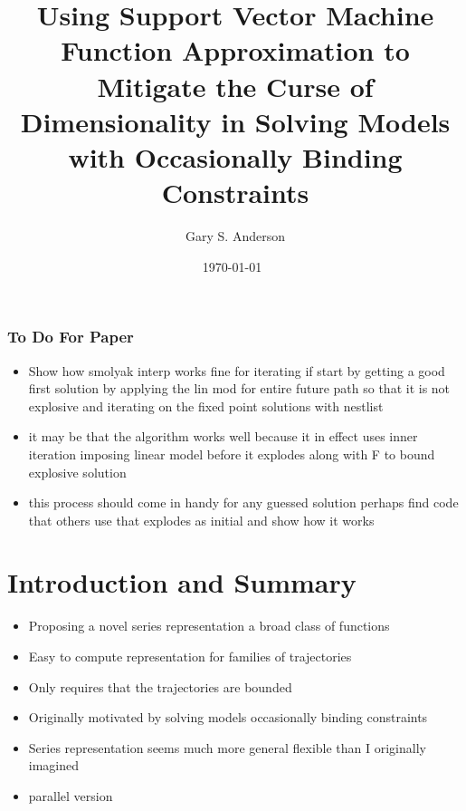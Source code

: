 \documentclass[tikz]{beamer}
\begin{document}
\title[SVM Regression for DR Series Approximation]{Using Support Vector Machine Function Approximation to
Mitigate the Curse of Dimensionality in Solving Models with Occasionally Binding Constraints}

\author{Gary S. Anderson}
\date{\today\ } 


\frame{\titlepage}

\begin{frame}
  \frametitle{To Do For Paper}

  \begin{itemize}
  \item Show how smolyak interp works fine for iterating if start by getting
    a good first solution by applying the lin mod for entire future path so that it is not explosive and iterating on the fixed point solutions  with nestlist
    
  \item it may be that the algorithm works well because it in effect uses inner  iteration imposing linear model before it explodes along with F to bound explosive solution 
  \item this process should come in handy for any guessed solution perhaps
    find code that others use that explodes as initial and show how it works
  \end{itemize}
\end{frame}
\section{Introduction and Summary}

\begin{frame}

 \begin{itemize}
 \item Proposing a novel series representation a broad class of functions
 \item Easy to compute representation for families of trajectories
\item Only requires that the trajectories are bounded
\item Originally motivated by solving models occasionally binding constraints
\item Series representation seems much more general flexible than I originally imagined
\item parallel version
\end{itemize}
\end{frame}
\end{document}
